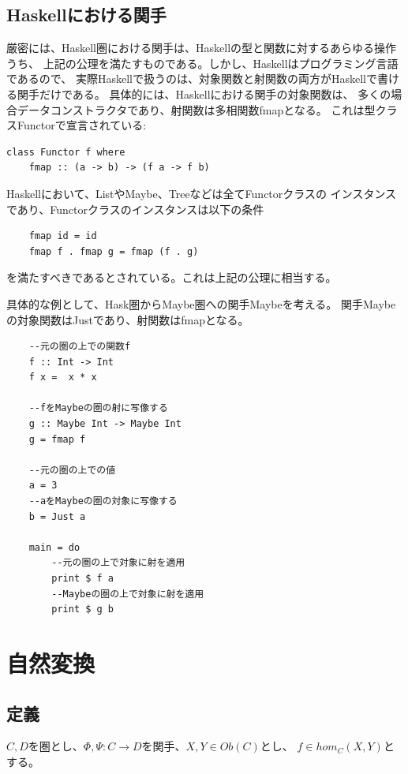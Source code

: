\documentclass{jsarticle}
\begin{document}
\subsection{Haskellにおける関手}
厳密には、Haskell圏における関手は、Haskellの型と関数に対するあらゆる操作うち、
上記の公理を満たすものである。しかし、Haskellはプログラミング言語であるので、
実際Haskellで扱うのは、対象関数と射関数の両方がHaskellで書ける関手だけである。
具体的には、Haskellにおける関手の対象関数は、
多くの場合データコンストラクタであり、射関数は多相関数fmapとなる。
これは型クラスFunctorで宣言されている:

\begin{lstlisting}
class Functor f where
    fmap :: (a -> b) -> (f a -> f b)
\end{lstlisting}

Haskellにおいて、ListやMaybe、Treeなどは全てFunctorクラスの
インスタンスであり、Functorクラスのインスタンスは以下の条件
\begin{lstlisting}
    fmap id = id
    fmap f . fmap g = fmap (f . g)
\end{lstlisting}
を満たすべきであるとされている。これは上記の公理に相当する。

具体的な例として、Hask圏からMaybe圏への関手Maybeを考える。
関手Maybeの対象関数はJustであり、射関数はfmapとなる。
\begin{lstlisting}
    --元の圏の上での関数f
    f :: Int -> Int
    f x =  x * x

    --fをMaybeの圏の射に写像する
    g :: Maybe Int -> Maybe Int
    g = fmap f

    --元の圏の上での値
    a = 3
    --aをMaybeの圏の対象に写像する
    b = Just a

    main = do
        --元の圏の上で対象に射を適用
        print $ f a
        --Maybeの圏の上で対象に射を適用
        print $ g b
\end{lstlisting}


\newpage

\section{自然変換}
\subsection{定義}
$C, D$を圏とし、$\Phi,\Psi:C\to D$を関手、$X,Y\in Ob(C)$とし、
$f\in hom_C(X,Y)$とする。
\end{document}
